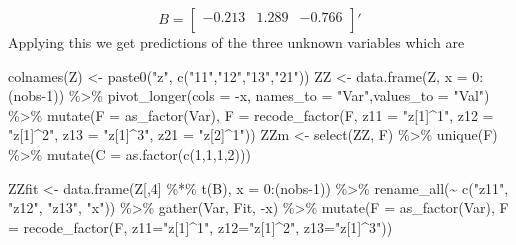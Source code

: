 \documentclass[
  letterpaper,
]{book}
\newenvironment{Shaded}{\begin{snugshade}}{\end{snugshade}}
\newcommand{\AttributeTok}[1]{\textcolor[rgb]{0.40,0.45,0.13}{#1}}
\newcommand{\DecValTok}[1]{\textcolor[rgb]{0.68,0.00,0.00}{#1}}
\newcommand{\FunctionTok}[1]{\textcolor[rgb]{0.28,0.35,0.67}{#1}}
\newcommand{\NormalTok}[1]{\textcolor[rgb]{0.00,0.23,0.31}{#1}}
\newcommand{\OtherTok}[1]{\textcolor[rgb]{0.00,0.23,0.31}{#1}}
\newcommand{\SpecialCharTok}[1]{\textcolor[rgb]{0.37,0.37,0.37}{#1}}
\newcommand{\StringTok}[1]{\textcolor[rgb]{0.13,0.47,0.30}{#1}}
\begin{document}
\[
 B = \left[\begin{array}{r}-0.213 &1.289 &-0.766 \\\end{array}\right]'
\] Applying this we get predictions of the three unknown variables which
are

\begin{Shaded}
\begin{Highlighting}[]
\FunctionTok{colnames}\NormalTok{(Z) }\OtherTok{\textless{}{-}} \FunctionTok{paste0}\NormalTok{(}\StringTok{"z"}\NormalTok{, }\FunctionTok{c}\NormalTok{(}\StringTok{"11"}\NormalTok{,}\StringTok{"12"}\NormalTok{,}\StringTok{"13"}\NormalTok{,}\StringTok{"21"}\NormalTok{))}
\NormalTok{ZZ   }\OtherTok{\textless{}{-}} \FunctionTok{data.frame}\NormalTok{(Z, }\AttributeTok{x =} \DecValTok{0}\SpecialCharTok{:}\NormalTok{(nobs}\DecValTok{{-}1}\NormalTok{)) }\SpecialCharTok{\%\textgreater{}\%} 
  \FunctionTok{pivot\_longer}\NormalTok{(}\AttributeTok{cols =} \SpecialCharTok{{-}}\NormalTok{x, }\AttributeTok{names\_to =} \StringTok{"Var"}\NormalTok{,}\AttributeTok{values\_to =} \StringTok{"Val"}\NormalTok{) }\SpecialCharTok{\%\textgreater{}\%} 
  \FunctionTok{mutate}\NormalTok{(}\AttributeTok{F =} \FunctionTok{as\_factor}\NormalTok{(Var), }
         \AttributeTok{F =} \FunctionTok{recode\_factor}\NormalTok{(F, }
                           \AttributeTok{z11 =} \StringTok{"z[1]\^{}1"}\NormalTok{, }
                           \AttributeTok{z12 =} \StringTok{"z[1]\^{}2"}\NormalTok{, }
                           \AttributeTok{z13 =} \StringTok{"z[1]\^{}3"}\NormalTok{, }
                           \AttributeTok{z21 =} \StringTok{"z[2]\^{}1"}\NormalTok{))}
\NormalTok{ZZm   }\OtherTok{\textless{}{-}} \FunctionTok{select}\NormalTok{(ZZ, F) }\SpecialCharTok{\%\textgreater{}\%} 
  \FunctionTok{unique}\NormalTok{(F) }\SpecialCharTok{\%\textgreater{}\%} 
  \FunctionTok{mutate}\NormalTok{(}\AttributeTok{C =} \FunctionTok{as.factor}\NormalTok{(}\FunctionTok{c}\NormalTok{(}\DecValTok{1}\NormalTok{,}\DecValTok{1}\NormalTok{,}\DecValTok{1}\NormalTok{,}\DecValTok{2}\NormalTok{)))}

\NormalTok{ZZfit }\OtherTok{\textless{}{-}} \FunctionTok{data.frame}\NormalTok{(Z[,}\DecValTok{4}\NormalTok{] }\SpecialCharTok{\%*\%} \FunctionTok{t}\NormalTok{(B), }\AttributeTok{x =} \DecValTok{0}\SpecialCharTok{:}\NormalTok{(nobs}\DecValTok{{-}1}\NormalTok{)) }\SpecialCharTok{\%\textgreater{}\%} 
  \FunctionTok{rename\_all}\NormalTok{(}\SpecialCharTok{\textasciitilde{}} \FunctionTok{c}\NormalTok{(}\StringTok{"z11"}\NormalTok{, }\StringTok{"z12"}\NormalTok{, }\StringTok{"z13"}\NormalTok{, }\StringTok{"x"}\NormalTok{)) }\SpecialCharTok{\%\textgreater{}\%} 
  \FunctionTok{gather}\NormalTok{(Var, Fit, }\SpecialCharTok{{-}}\NormalTok{x) }\SpecialCharTok{\%\textgreater{}\%} 
  \FunctionTok{mutate}\NormalTok{(}\AttributeTok{F =} \FunctionTok{as\_factor}\NormalTok{(Var), }
         \AttributeTok{F =} \FunctionTok{recode\_factor}\NormalTok{(F, }\AttributeTok{z11=}\StringTok{"z[1]\^{}1"}\NormalTok{, }\AttributeTok{z12=}\StringTok{"z[1]\^{}2"}\NormalTok{, }\AttributeTok{z13=}\StringTok{"z[1]\^{}3"}\NormalTok{))}


\end{Highlighting}
\end{Shaded}
\end{document}
